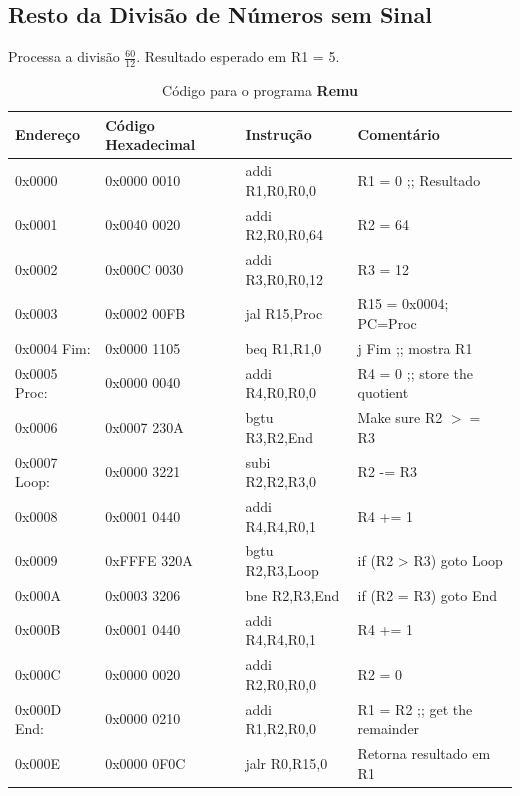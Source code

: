 \documentclass[12pt]{article}
\begin{document}
\subsection{Resto da Divisão de Números sem Sinal}\label{sec:programs:remu}

Processa a divisão $\frac{60}{12}$. Resultado esperado em R1 = 5.

\begin{table}[H]
    \centering
    \caption{Código para o programa \textbf{Remu}}
    \begin{tabular}{|l|l|l|l|}\hline
        \textbf{Endereço} & \textbf{Código Hexadecimal} & \textbf{Instrução} & \textbf{Comentário} \\\hline
        0x0000       & 0x0000 0010 & addi R1,R0,R0,0  & R1 = 0 ;; Resultado           \\\hline
        0x0001       & 0x0040 0020 & addi R2,R0,R0,64 & R2 = 64                       \\\hline
        0x0002       & 0x000C 0030 & addi R3,R0,R0,12 & R3 = 12                       \\\hline
        0x0003       & 0x0002 00FB & jal R15,Proc     & R15 = 0x0004; PC=Proc         \\\hline
        0x0004 Fim:  & 0x0000 1105 & beq R1,R1,0      & j Fim ;; mostra R1            \\\hline
        0x0005 Proc: & 0x0000 0040 & addi R4,R0,R0,0  & R4 = 0 ;; store the quotient  \\\hline
        0x0006       & 0x0007 230A & bgtu R3,R2,End   & Make sure R2 $>=$ R3          \\\hline
        0x0007 Loop: & 0x0000 3221 & subi R2,R2,R3,0  & R2 -= R3                      \\\hline
        0x0008       & 0x0001 0440 & addi R4,R4,R0,1  & R4 += 1                       \\\hline
        0x0009       & 0xFFFE 320A & bgtu R2,R3,Loop  & if (R2 > R3) goto Loop        \\\hline
        0x000A       & 0x0003 3206 & bne  R2,R3,End   & if (R2 \!= R3) goto End       \\\hline
        0x000B       & 0x0001 0440 & addi R4,R4,R0,1  & R4 += 1                       \\\hline
        0x000C       & 0x0000 0020 & addi R2,R0,R0,0  & R2 = 0                        \\\hline
        0x000D End:  & 0x0000 0210 & addi R1,R2,R0,0  & R1 = R2 ;; get the remainder  \\\hline
        0x000E       & 0x0000 0F0C & jalr R0,R15,0    & Retorna resultado em R1       \\\hline
    \end{tabular}\label{tab:programs:remu}
\end{table}
\end{document}
